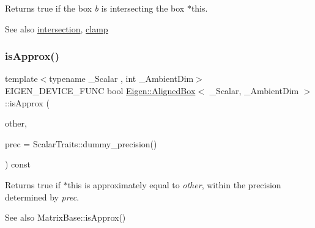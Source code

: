 \begin{DoxyReturn}{Returns}
true if the box {\itshape b} is intersecting the box {\ttfamily $\ast$this}. 
\end{DoxyReturn}
\begin{DoxySeeAlso}{See also}
\mbox{\hyperlink{class_eigen_1_1_aligned_box_ac31024e7fccb025810535eb5a673ed14}{intersection}}, \mbox{\hyperlink{class_eigen_1_1_aligned_box_a7df756eb446280c7d738ac5ce73d4032}{clamp}} 
\end{DoxySeeAlso}
\mbox{\label{class_eigen_1_1_aligned_box_a9d21b1102d3b6944a80a563d3974c83c}} 
\subsubsection{\texorpdfstring{isApprox()}{isApprox()}}
{\footnotesize\ttfamily template$<$typename \+\_\+\+Scalar , int \+\_\+\+Ambient\+Dim$>$ \\
E\+I\+G\+E\+N\+\_\+\+D\+E\+V\+I\+C\+E\+\_\+\+F\+U\+NC bool \mbox{\hyperlink{class_eigen_1_1_aligned_box}{Eigen\+::\+Aligned\+Box}}$<$ \+\_\+\+Scalar, \+\_\+\+Ambient\+Dim $>$\+::is\+Approx (\begin{DoxyParamCaption}\item[{const \mbox{\hyperlink{class_eigen_1_1_aligned_box}{Aligned\+Box}}$<$ \+\_\+\+Scalar, \+\_\+\+Ambient\+Dim $>$ \&}]{other,  }\item[{const Real\+Scalar \&}]{prec = {\ttfamily ScalarTraits\+:\+:dummy\+\_\+precision()} }\end{DoxyParamCaption}) const\hspace{0.3cm}{\ttfamily [inline]}}

\begin{DoxyReturn}{Returns}
{\ttfamily true} if {\ttfamily $\ast$this} is approximately equal to {\itshape other}, within the precision determined by {\itshape prec}.
\end{DoxyReturn}
\begin{DoxySeeAlso}{See also}
Matrix\+Base\+::is\+Approx() 
\end{DoxySeeAlso}
\mbox{\label{class_eigen_1_1_aligned_box_a0d194e2e56c3bef854e88ca2aba04c9e}} 
